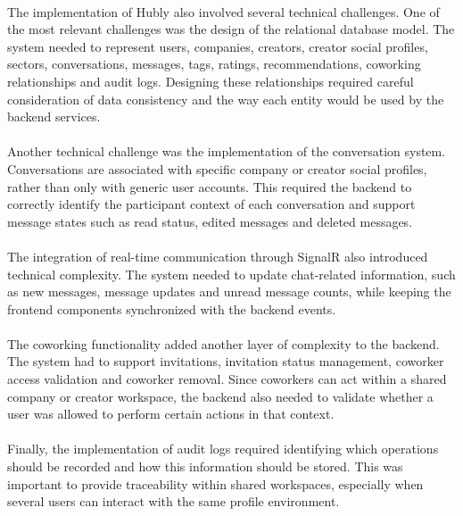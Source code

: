\paragraph{}The implementation of Hubly also involved several technical challenges. One of the most relevant challenges was the design of the relational database model. The system needed to represent users, companies, creators, creator social profiles, sectors, conversations, messages, tags, ratings, recommendations, coworking relationships and audit logs. Designing these relationships required careful consideration of data consistency and the way each entity would be used by the backend services.

\paragraph{}Another technical challenge was the implementation of the conversation system. Conversations are associated with specific company or creator social profiles, rather than only with generic user accounts. This required the backend to correctly identify the participant context of each conversation and support message states such as read status, edited messages and deleted messages.

\paragraph{}The integration of real-time communication through SignalR also introduced technical complexity. The system needed to update chat-related information, such as new messages, message updates and unread message counts, while keeping the frontend components synchronized with the backend events.

\paragraph{}The coworking functionality added another layer of complexity to the backend. The system had to support invitations, invitation status management, coworker access validation and coworker removal. Since coworkers can act within a shared company or creator workspace, the backend also needed to validate whether a user was allowed to perform certain actions in that context.

\paragraph{}Finally, the implementation of audit logs required identifying which operations should be recorded and how this information should be stored. This was important to provide traceability within shared workspaces, especially when several users can interact with the same profile environment.

